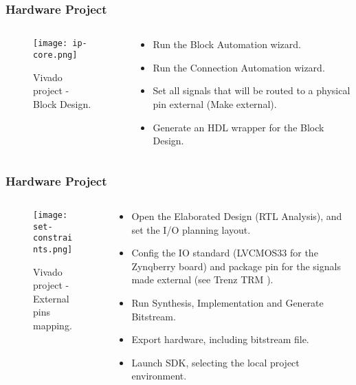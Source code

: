 \begin{frame}
	\frametitle{Hardware Project}
	\begin{columns}
		\begin{column}{0.5\textwidth}
			\begin{figure}
				\texttt{[image: ip-core.png]}
				\caption{Vivado project - Block Design.}\label{fig:ip-core}
			\end{figure}
		\end{column}
		\begin{column}{0.5\textwidth}
			\begin{itemize}
				\item Run the Block Automation wizard.
				\item Run the Connection Automation wizard.
				\item Set all signals that will be routed to a physical pin external (Make external).
				\item Generate an HDL wrapper for the Block Design.
			\end{itemize}
		\end{column}
	\end{columns}
\end{frame}

\begin{frame}
	\frametitle{Hardware Project}
	\begin{columns}
		\begin{column}{0.5\textwidth}
			\begin{figure}
				\texttt{[image: set-constraints.png]}
				\caption{Vivado project - External pins mapping.}\label{fig:set-constraints}
			\end{figure}
		\end{column}
		\begin{column}{0.5\textwidth}
			\begin{itemize}
				\item Open the Elaborated Design (RTL Analysis), and set the I/O planning layout.
				\item Config the IO standard (LVCMOS33 for the Zynqberry board) and package pin for the signals made external (see Trenz TRM \cite{zynq-trm}).
				\item Run Synthesis, Implementation and Generate Bitstream.
				\item Export hardware, including bitstream file.
				\item Launch SDK, selecting the local project environment.
			\end{itemize}
		\end{column}
	\end{columns}
\end{frame}

